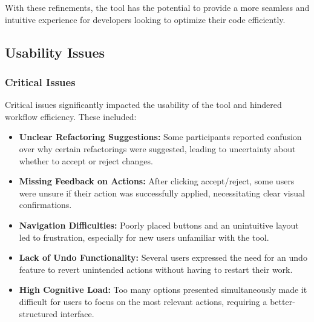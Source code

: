 \documentclass{article}
\begin{document}
With these refinements, the tool has the potential to provide a more seamless and intuitive experience for developers looking to optimize their code efficiently.

\subsection{Usability Issues}

\subsubsection{Critical Issues}
Critical issues significantly impacted the usability of the tool and hindered workflow efficiency. These included:
\begin{itemize}
\item \textbf{Unclear Refactoring Suggestions:} Some participants reported confusion over why certain refactorings were suggested, leading to uncertainty about whether to accept or reject changes.
\item \textbf{Missing Feedback on Actions:} After clicking accept/reject, some users were unsure if their action was successfully applied, necessitating clear visual confirmations.
\item \textbf{Navigation Difficulties:} Poorly placed buttons and an unintuitive layout led to frustration, especially for new users unfamiliar with the tool.
\item \textbf{Lack of Undo Functionality:} Several users expressed the need for an undo feature to revert unintended actions without having to restart their work.
\item \textbf{High Cognitive Load:} Too many options presented simultaneously made it difficult for users to focus on the most relevant actions, requiring a better-structured interface.
\end{itemize}
\end{document}
